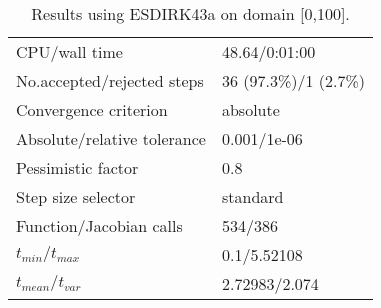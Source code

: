 \begin{table}
\begin{tabular}{l|l}\hline
CPU/wall time & 48.64/0:01:00 \\ 
No.accepted/rejected steps & 36 (97.3\%)/1 (2.7\%) \\ 
Convergence criterion & absolute \\ 
Absolute/relative tolerance & 0.001/1e-06 \\ 
Pessimistic factor & 0.8 \\ 
Step size selector & standard \\ 
Function/Jacobian calls & 534/386 \\ 
$t_{min} / t_{max}$ & 0.1/5.52108 \\ 
$t_{mean} / t_{var}$ & 2.72983/2.074 \\ \hline 
\end{tabular} 
\caption{Results using ESDIRK43a on domain [0,100].} 
\end{table} 
